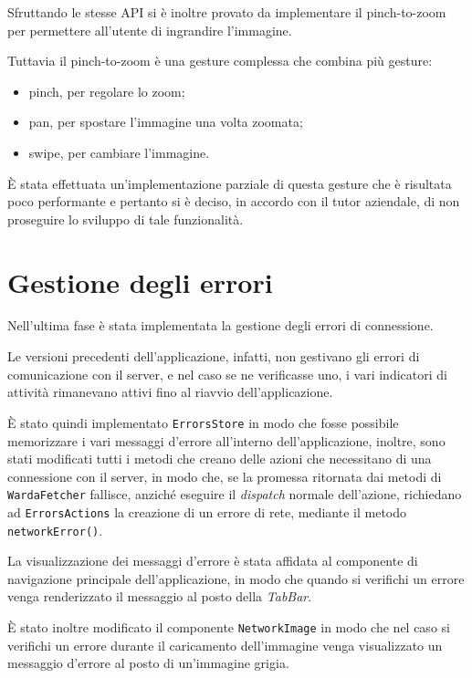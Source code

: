 Sfruttando le stesse API si è inoltre provato da implementare il pinch-to-zoom per permettere all'utente di ingrandire l'immagine.

Tuttavia il pinch-to-zoom è una gesture complessa che combina più gesture:
\begin{itemize}
\item pinch, per regolare lo zoom;
\item pan, per spostare l'immagine una volta zoomata;
\item swipe, per cambiare l'immagine.
\end{itemize}

\`E stata effettuata un'implementazione parziale di questa gesture che è risultata poco performante e pertanto si è deciso, in accordo con il tutor aziendale, di non proseguire lo sviluppo di tale funzionalità.

\section{Gestione degli errori}

Nell'ultima fase è stata implementata la gestione degli errori di connessione.

Le versioni precedenti dell'applicazione, infatti, non gestivano gli errori di comunicazione con il server, e nel caso se ne verificasse uno, i vari indicatori di attività rimanevano attivi fino al riavvio dell'applicazione.

\`E stato quindi implementato \texttt{ErrorsStore} in modo che fosse possibile memorizzare i vari messaggi d'errore all'interno dell'applicazione, inoltre, sono stati modificati tutti i metodi che creano delle azioni che necessitano di una connessione con il server, in modo che, se la promessa ritornata dai metodi di \texttt{WardaFetcher} fallisce, anziché eseguire il \textit{dispatch} normale dell'azione, richiedano ad \texttt{ErrorsActions} la creazione di un errore di rete, mediante il metodo \texttt{networkError()}.

La visualizzazione dei messaggi d'errore è stata affidata al componente di navigazione principale dell'applicazione, in modo che quando si verifichi un errore venga renderizzato il messaggio al posto della \textit{TabBar}.

\`E stato inoltre modificato il componente \texttt{NetworkImage} in modo che nel caso si verifichi un errore durante il caricamento dell'immagine venga visualizzato un messaggio d'errore al posto di un'immagine grigia.